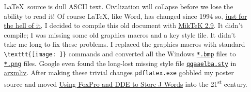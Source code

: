 \LaTeX\ source is dull ASCII text. Civilization will collapse
before we lose the ability to read it! Of course \LaTeX, like
Word, has changed since 1994 so,
\href{http://www.youtube.com/watch?v=RK9sO7Cjy-8}{just for the hell of
it}, I decided to compile this old document with
\href{http://miktex.org/}{MikTeK 2.9}. It didn't compile; I was missing
some old graphics macros and a key style file. It didn't take me long to
fix these problems. I replaced the graphics macros with standard
\verb|\texttt{[image: ]}| commands and converted all the
Windows \href{http://www.fileinfo.com/extension/bmp}{\texttt{*.bmp}} files to
\href{http://www.fileinfo.com/extension/png}{\texttt{*.png}} files. Google even
found the long-lost missing style file
\href{http://arxmliv.kwarc.info/macro\_sty\_detail.php?filename=qqaaelba.sty}{\texttt{qqaaelba.sty}}
in \href{http://arxmliv.kwarc.info/}{arxmliv}. After making these
trivial changes \texttt{pdflatex.exe} gobbled my poster source and moved
\href{https://docs.google.com/leaf?id=0B3hRbt360vl5NDliYzllMzYtMTc2Ni00YzVhLWIyNDAtYmUzN2I0OTkxYjEx\&sort=name\&layout=list\&num=50}{Using
FoxPro and DDE to Store J Words} into the 21\textsuperscript{st} century.




%